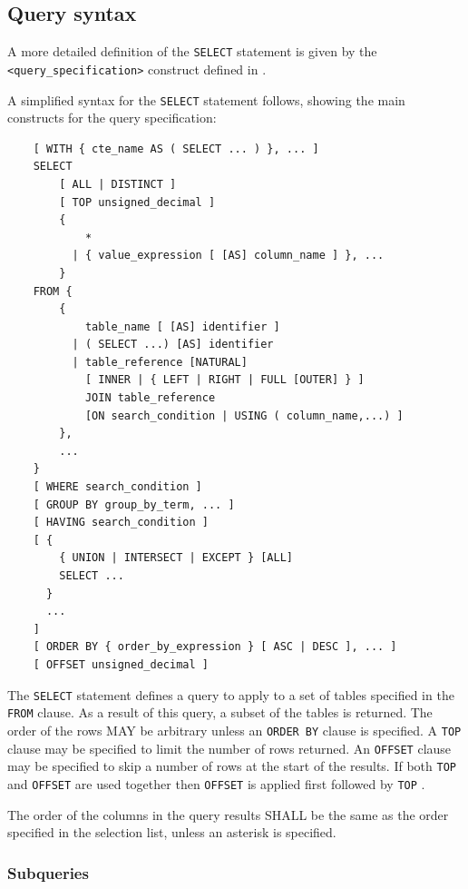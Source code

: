 \documentclass[11pt,a4paper]{ivoa}
\begin{document}
\clearpage %
\subsection{Query syntax}
\label{sec:syntax}

A more detailed definition of the \verb:SELECT: statement is given by the \verb:<query_specification>:
construct defined in .

A simplified syntax for the \verb:SELECT: statement follows, showing the main constructs for
the query specification:

\begin{verbatim}
    [ WITH { cte_name AS ( SELECT ... ) }, ... ]
    SELECT
        [ ALL | DISTINCT ]
        [ TOP unsigned_decimal ]
        {
            *
          | { value_expression [ [AS] column_name ] }, ...
        }
    FROM {
        {
            table_name [ [AS] identifier ]
          | ( SELECT ...) [AS] identifier
          | table_reference [NATURAL]
            [ INNER | { LEFT | RIGHT | FULL [OUTER] } ]
            JOIN table_reference
            [ON search_condition | USING ( column_name,...) ]
        },
        ...
    }
    [ WHERE search_condition ]
    [ GROUP BY group_by_term, ... ]
    [ HAVING search_condition ]
    [ {
        { UNION | INTERSECT | EXCEPT } [ALL]
        SELECT ...
      }
      ...
    ]
    [ ORDER BY { order_by_expression } [ ASC | DESC ], ... ]
    [ OFFSET unsigned_decimal ]
\end{verbatim}

The \verb:SELECT: statement defines a query to apply to a set of tables specified
in the \verb:FROM: clause. As a result of this query, a subset of the tables
is returned.
The order of the rows MAY be arbitrary unless an \verb:ORDER BY: clause is specified.
A \verb:TOP: clause may be specified to limit the number of rows returned.
An \verb:OFFSET: clause may be specified to skip a number of rows at the start
of the results.
If both \verb:TOP: and \verb:OFFSET: are used together then \verb:OFFSET: is applied
first followed by \verb:TOP: .

The order of the columns in the query results SHALL be the same as the
order specified in the selection list,
unless an asterisk is specified.

\subsubsection{Subqueries}
\label{sec:subqueries}
\end{document}
